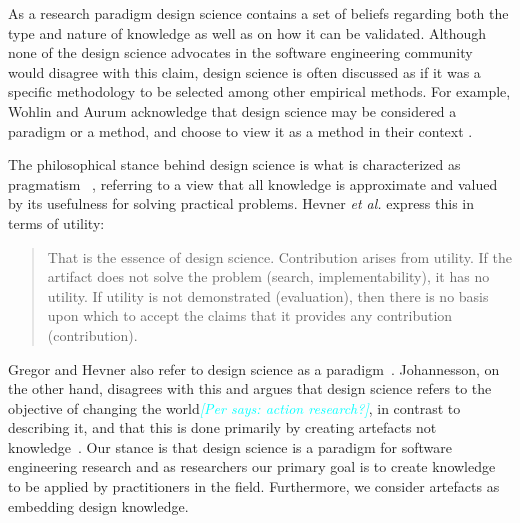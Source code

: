 \documentclass[graybox]{svmult}
\newcommand{\emelie}[1]{\textcolor{red}{{\it [Emelie says: #1]}}}
\newcommand{\per}[1]{\textcolor{cyan}{{\it [Per says: #1]}}}
\newcommand{\emelie}[1]{}
\newcommand{\per}[1]{}
\begin{document}
As a research paradigm design science contains a set of beliefs regarding both the type and nature of knowledge as well as on how it can be validated. Although none of the design science advocates in the software engineering community would disagree with this claim, design science is often discussed as if it was a specific methodology to be selected among other empirical methods. For example, Wohlin and Aurum acknowledge that design science may be considered a paradigm or a method, and choose to view it as a method in their context \cite{Wohlin2015}.

The philosophical stance behind design science is what is characterized as pragmatism~\cite{easterbrook_selecting_2008}%
, referring to a view that all knowledge is approximate and valued by its usefulness for solving practical problems. Hevner \emph{et al.} express this in terms of utility: 

\begin{quote}
	That is the essence of design science. Contribution arises from utility. If the artifact does not solve the problem (search, implementability), it has no utility. If utility is not demonstrated (evaluation), then there is no basis upon which to accept the claims that it provides any contribution (contribution).~\cite[p. 91]{hevner_design_2004}
\end{quote}


Gregor and Hevner also refer to design science as a paradigm~\cite{gregor_positioning_2013}. Johannesson, on the other hand, disagrees with this and argues that design science refers to the objective of changing the world\per{action research?}, in contrast to describing it, and that this is done primarily by creating artefacts not knowledge~\cite{johannesson_introduction_2014}. Our stance is that design science is a paradigm for software engineering research and as researchers our primary goal is to create knowledge to be applied by practitioners in the field. Furthermore, we consider artefacts as embedding design knowledge. 
\end{document}
